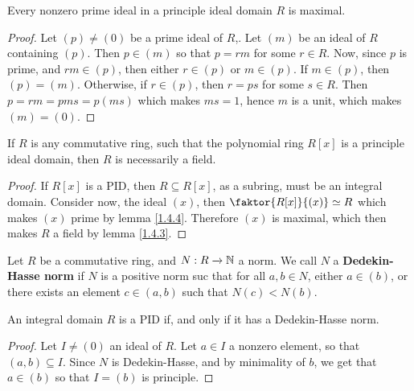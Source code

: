 \begin{lemma}\label{2.2.2}
    Every nonzero prime ideal in a principle ideal domain $R$ is maximal.
\end{lemma}
\begin{proof}
    Let $(p) \neq (0)$ be a prime ideal of $R$,. Let $(m)$ be an ideal of $R$
    containing $(p)$. Then $p \in (m)$ so that $p=rm$ for some  $r \in R$. Now,
    since $p$ is prime, and $rm \in (p)$, then either $r \in (p)$ or $m \in
    (p)$. If $m \in (p)$, then $(p)=(m)$. Otherwise, if $r \in (p)$, then $r=ps$
    for some  $s \in R$. Then  $p=rm=pms=p(ms)$ which makes $ms=1$, hence $m$ is
    a unit, which makes $(m)=(0)$.
\end{proof}
\begin{corollary}
    If $R$ is any commutative ring, such that the polynomial ring $R[x]$ is a
    principle ideal domain, then $R$ is necessarily a field.
\end{corollary}
\begin{proof}
    If $R[x]$ is a PID, then $R \subseteq R[x]$, as a subring, must be an
    integral domain. Consider now, the ideal $(x)$, then $\faktor{R[x]}{(x)}
    \simeq R$ which makes $(x)$ prime by lemma \ref{1.4.4}. Therefore $(x)$ is
    maximal, which then makes $R$ a field by lemma \ref{1.4.3}.
\end{proof}

\begin{definition}
    Let $R$ be a commutative ring, and  $N:R \xrightarrow{} \mathbb{N}$ a norm. We call
    $N$ a \textbf{Dedekin-Hasse norm} if $N$ is a positive norm suc that for
    all $a,b \in N$, either $a \in (b)$, or there exists an element $c \in
    (a,b)$ such that $N(c)<N(b)$.
\end{definition}

\begin{lemma}\label{2.2.3}
    An integral domain $R$ is a PID if, and only if it has a Dedekin-Hasse norm.
\end{lemma}
\begin{proof}
    Let $I \neq (0)$ an ideal of $R$. Let $a \in I$ a nonzero element, so that
    $(a,b) \subseteq I$. Since $N$ is Dedekin-Hasse, and by minimality of $b$,
    we get that $a \in (b)$ so that $I=(b)$ is principle.
\end{proof}

